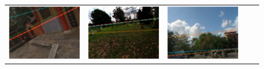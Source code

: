 \begin{figure}
\begin{tabular}{cccc|c}
\includegraphics[width=\exampleresultswidth\linewidth]{figures/method/results/pano_addgtzfdddfgrh_jpg-2.png} &
\includegraphics[width=\exampleresultswidth\linewidth]{figures/method/results/pano_addhxkomphqrlr_jpg-4.png} &
\includegraphics[width=\exampleresultswidth\linewidth]{figures/method/results/pano_ayfzatxlublfjc_jpg-5.png} &

\end{tabular}
\end{figure}
